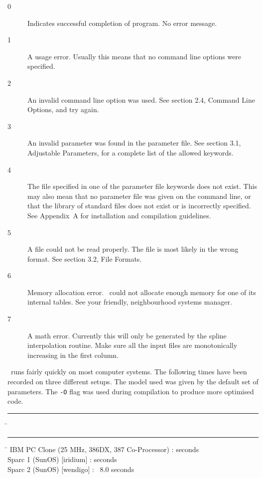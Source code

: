 \begin{description}
\item[0] Indicates successful completion of program. No error message.
\item[1] A usage error. Usually this means that no command line options were
specified.
\item[2] An invalid command line option was used. See section 2.4, Command
Line Options, and try again.
\item[3] An invalid parameter was found in the parameter file. See section 3.1,
Adjustable Parameters, for a complete list of the allowed keywords.
\item[4] The file specified in one of the parameter file keywords does not 
exist. This may also mean that no parameter file was given on the command
line, or that the library of standard files does not exist or is
incorrectly specified. See Appendix~A for installation and compilation
guidelines.
\item[5] A file could not be read properly. The file is most likely in the
wrong format. See section 3.2, File Formats.
\item[6] Memory allocation error. \egm\ could not allocate enough memory
for one of its internal tables. See your friendly, neighbourhood systems
manager.
\item[7] A math error. Currently this will only be generated by the spline
interpolation routine. Make sure all the input files are monotonically
increasing in the first column.
\end{description}

\egm\ runs fairly quickly on most computer systems. The following times have
been recorded on three different setups. The model used was given by the 
default set of parameters. The {\tt -O} flag was used during compilation to
produce more optimised code.

\begin{tabbing}
\rule{1cm}{0cm} \= \rule{10cm}{0cm} \= \kill 
\> IBM PC Clone (25 MHz, 386DX, 387 Co-Processor) :  seconds \\
\> Sparc 1 (SunOS) [iridium] :                       seconds \\
\> Sparc 2 (SunOS) [wendigo] :                      \> ~8.0 seconds 
\end{tabbing}


